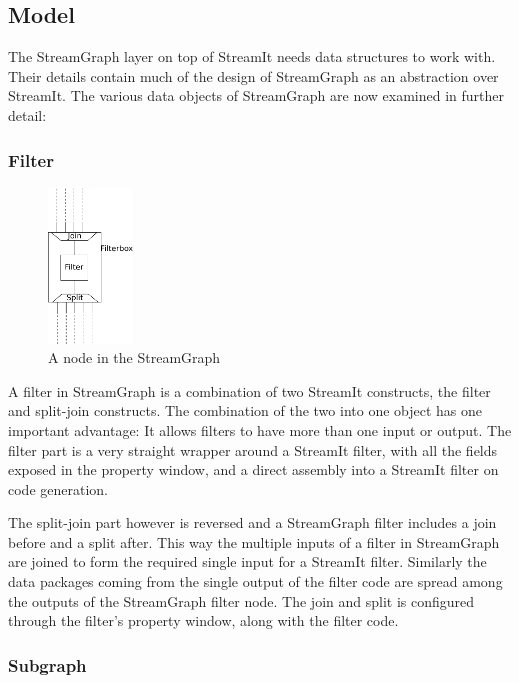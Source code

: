 \documentclass[journal]{IEEEtran}
\begin{document}
\subsection{Model}

\noindent The StreamGraph layer on top of StreamIt needs data structures to
work with. Their details contain much of the design of StreamGraph as an
abstraction over StreamIt. The various data objects of StreamGraph are now
examined in further detail:

\subsubsection{Filter}
\begin{figure}[h]
  \centering
  \includegraphics[width=0.2\textwidth]{FilterBoxGraphic}
  \caption{A node in the StreamGraph}
  \label{fig_filter_node}
\end{figure}

A filter in StreamGraph is a combination of two StreamIt constructs, the
filter and split-join constructs. The combination of the two into one object
has one important advantage: It allows filters to have more than one input or
output. The filter part is a very straight wrapper around a StreamIt filter,
with all the fields exposed in the property window, and a direct assembly into
a StreamIt filter on code generation.

The split-join part however is reversed and a StreamGraph filter includes a
join before and a split after. This way the multiple inputs of a filter in
StreamGraph are joined to form the required single input for a StreamIt
filter. Similarly the data packages coming from the single output of the
filter code are spread among the outputs of the StreamGraph filter node. The
join and split is configured through the filter's property window, along with
the filter code.

\subsubsection{Subgraph}
\end{document}
